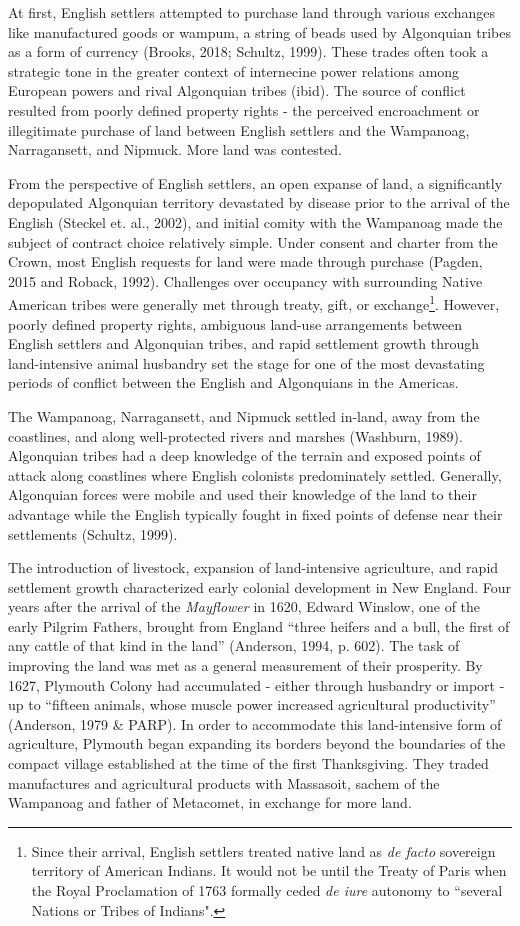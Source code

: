 \documentclass[sn-mathphys]{sn-jnl}%
\theoremstyle{thmstyleone}%
\theoremstyle{thmstyletwo}%
\theoremstyle{thmstylethree}%
\begin{document}
At first, English settlers attempted to purchase land through various exchanges like manufactured goods or wampum, a string of beads used by Algonquian tribes as a form of currency (Brooks, 2018; Schultz, 1999). These trades often took a strategic tone in the greater context of internecine power relations among European powers and rival Algonquian tribes (ibid). The source of conflict resulted from poorly defined property rights - the perceived encroachment or illegitimate purchase of land between English settlers and the Wampanoag, Narragansett, and Nipmuck. More land was contested.

From the perspective of English settlers, an open expanse of land, a significantly depopulated Algonquian territory devastated by disease prior to the arrival of the English (Steckel et. al., 2002), and initial comity with the Wampanoag made the subject of contract choice relatively simple. Under consent and charter from the Crown, most English requests for land were made through purchase (Pagden, 2015 and Roback, 1992). Challenges over occupancy with surrounding Native American tribes were generally met through treaty, gift, or exchange\footnote{Since their arrival, English settlers treated native land as {\em de facto} sovereign territory of American Indians. It would not be until the Treaty of Paris when the Royal Proclamation of 1763 formally ceded {\em de iure} autonomy to ``several Nations or Tribes of Indians".}. However, poorly defined property rights, ambiguous land-use arrangements between English settlers and Algonquian tribes, and rapid settlement growth through land-intensive animal husbandry set the stage for one of the most devastating periods of conflict between the English and Algonquians in the Americas.

The Wampanoag, Narragansett, and Nipmuck settled in-land, away from the coastlines, and along well-protected rivers and marshes (Washburn, 1989). Algonquian tribes had a deep knowledge of the terrain and exposed points of attack along coastlines where English colonists predominately settled. Generally, Algonquian forces were mobile and used their knowledge of the land to their advantage while the English typically fought in fixed points of defense near their settlements (Schultz, 1999). 

The introduction of livestock, expansion of land-intensive agriculture, and rapid settlement growth characterized early colonial development in New England. Four years after the arrival of the {\em Mayflower} in 1620, Edward Winslow, one of the early Pilgrim Fathers, brought from England ``three heifers and a bull, the first of any cattle of that kind in the land'' (Anderson, 1994, p. 602). The task of improving the land was met as a general measurement of their prosperity. By 1627, Plymouth Colony had accumulated - either through husbandry or import - up to ``fifteen animals, whose muscle power increased agricultural productivity'' (Anderson, 1979 \& PARP). In order to accommodate this land-intensive form of agriculture, Plymouth began expanding its borders beyond the boundaries of the compact village established at the time of the first Thanksgiving. They traded manufactures and agricultural products with Massasoit, sachem of the Wampanoag and father of Metacomet, in exchange for more land.
\end{document}
